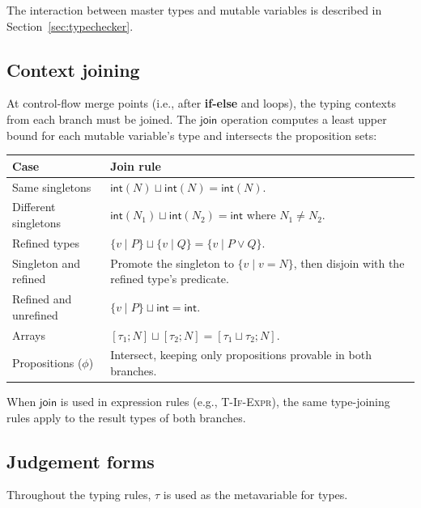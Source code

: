 The interaction between master types and mutable variables is described in Section~\ref{sec:typechecker}.

\subsection{Context joining}\label{sec:context-joining}

At control-flow merge points (i.e., after \textbf{if-else} and loops), the typing contexts from each branch must be joined. The $\textsf{join}$ operation computes a least upper bound for each mutable variable's type and intersects the proposition sets:

\begin{center}
\small
\begin{tabularx}{0.96\textwidth}{>{\raggedright\arraybackslash}p{} >{\raggedright\arraybackslash}X}
\toprule
\textbf{Case} & \textbf{Join rule} \\
\midrule
Same singletons & $\textsf{int}(N) \sqcup \textsf{int}(N) = \textsf{int}(N)$. \\
Different singletons & $\textsf{int}(N_1) \sqcup \textsf{int}(N_2) = \textsf{int}$ where $N_1 \ne N_2$. \\
Refined types & $\{v \mid P\} \sqcup \{v \mid Q\} = \{v \mid P \vee Q\}$. \\
Singleton and refined & Promote the singleton to $\{v \mid v = N\}$, then disjoin with the refined type's predicate. \\
Refined and unrefined & $\{v \mid P\} \sqcup \textsf{int} = \textsf{int}$. \\
Arrays & $[\tau_1; N] \sqcup [\tau_2; N] = [\tau_1 \sqcup \tau_2; N]$. \\
Propositions ($\phi$) & Intersect, keeping only propositions provable in both branches. \\
\bottomrule
\end{tabularx}
\end{center}

\noindent When $\textsf{join}$ is used in expression rules (e.g., \textsc{T-If-Expr}), the same type-joining rules apply to the result types of both branches.

\subsection{Judgement forms}\label{sec:judgement-forms}

Throughout the typing rules, $\tau$ is used as the metavariable for types.

